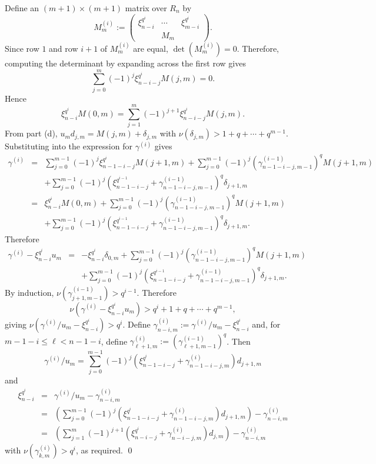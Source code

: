 \documentclass{amsart}
\begin{document}
Define an $(m+1)\times(m+1)$ matrix over $R_{n}$ by
$$M_m^{(i)}:=\begin{pmatrix}
\xi_{n-i}^{q^i}&\cdots &\xi_{m-i}^{q^i}\\
&M_m&
\end{pmatrix}.$$
Since row $1$ and row $i+1$ of $M_m^{(i)}$ are equal, $\det(M_m^{(i)})=0$. Therefore, computing the determinant by expanding across the first row gives
$$\sum_{j=0}^m (-1)^j\xi_{n-i-j}^{q^i} M(j,m)=0.$$
Hence
$$\xi_{n-i}^{q^i}M(0,m)=\sum_{j=1}^m (-1)^{j+1}\xi_{n-i-j}^{q^i} M(j,m).$$
From part (d), $u_m d_{j,m}=M(j,m)+\delta_{j,m}$ with $\nu(\delta_{j,m})>1+q+\cdots +q^{m-1}$.
Substituting into the expression for $\gamma^{(i)}$ gives 
\begin{eqnarray*}
\gamma^{(i)}&=&\sum_{j=0}^{m-1}(-1)^{j}\xi_{n-1-i-j}^{q^{i}}M(j+1,m)
+\sum_{j=0}^{m-1}(-1)^{j}(\gamma_{n-1-i-j,m-1}^{(i-1)})^q M(j+1,m)\\
&&+\sum_{j=0}^{m-1}(-1)^{j}(\xi_{n-1-i-j}^{q^{i-1}}+\gamma_{n-1-i-j,m-1}^{(i-1)})^q \delta_{j+1,m}\\
&=&\xi_{n-i}^{q^i}M(0,m)+\sum_{j=0}^{m-1}(-1)^{j}(\gamma_{n-1-i-j,m-1}^{(i-1)})^q M(j+1,m)\\
&&+\sum_{j=0}^{m-1}(-1)^{j}(\xi_{n-1-i-j}^{q^{i-1}}+\gamma_{n-1-i-j,m-1}^{(i-1)})^q \delta_{j+1,m}.
 \end{eqnarray*}
 Therefore
\begin{eqnarray*}
\gamma^{(i)}-\xi_{n-i}^{q^i}u_m&=&-\xi_{n-i}^{q^i}\delta_{0,m}+\sum_{j=0}^{m-1}(-1)^{j}(\gamma_{n-1-i-j,m-1}^{(i-1)})^q M(j+1,m)\\
&&+\sum_{j=0}^{m-1}(-1)^{j}(\xi_{n-1-i-j}^{q^{i-1}}+\gamma_{n-1-i-j,m-1}^{(i-1)})^q \delta_{j+1,m}.
\end{eqnarray*}
By induction, $\nu(\gamma_{j+1,m-1}^{(i-1)})>q^{i-1}$. Therefore $$\nu(\gamma^{(i)}-\xi_{n-i}^{q^i}u_m)> q^i+1+q+\cdots +q^{m-1},$$
giving $\nu(\gamma^{(i)}/u_m-\xi_{n-i}^{q^i})>q^i$. Define $\gamma_{n-i,m}^{(i)}:=\gamma^{(i)}/u_m-\xi_{n-i}^{q^i}$ and, for $m-1-i\leq\ell<n-1-i$,
define $\gamma_{\ell+1,m}^{(i)}:=(\gamma_{\ell+1,m-1}^{(i-1)})^q$. Then
$$\gamma^{(i)}/u_m=\sum_{j=0}^{m-1}(-1)^{j}(\xi_{n-1-i-j}^{q^{i}}+\gamma_{n-1-i-j,m}^{(i)}) d_{j+1,m}$$
and
\begin{eqnarray*}
\xi_{n-i}^{q^i}&=&\gamma^{(i)}/u_m-\gamma_{n-i,m}^{(i)}\\
&=&\left(\sum_{j=0}^{m-1}(-1)^{j}(\xi_{n-1-i-j}^{q^{i}}+\gamma_{n-1-i-j,m}^{(i)}) d_{j+1,m}\right)-\gamma_{n-i,m}^{(i)}\\
&=&\left(\sum_{j=1}^{m}(-1)^{j+1}(\xi_{n-i-j}^{q^{i}}+\gamma_{n-i-j,m}^{(i)}) d_{j,m}\right)-\gamma_{n-i,m}^{(i)}
\end{eqnarray*}
with $\nu(\gamma_{k,m}^{(i)})>q^i$, as required.  \qed
\end{document}
